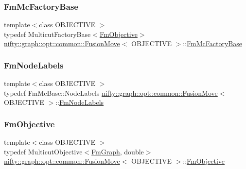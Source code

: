 \subsubsection{\texorpdfstring{Fm\+Mc\+Factory\+Base}{FmMcFactoryBase}}
{\footnotesize\ttfamily template$<$class O\+B\+J\+E\+C\+T\+I\+VE $>$ \\
typedef Multicut\+Factory\+Base$<$\hyperlink{classnifty_1_1graph_1_1opt_1_1common_1_1FusionMove_a238d47fabd4bf7f5a923885f9203536c}{Fm\+Objective}$>$ \hyperlink{classnifty_1_1graph_1_1opt_1_1common_1_1FusionMove}{nifty\+::graph\+::opt\+::common\+::\+Fusion\+Move}$<$ O\+B\+J\+E\+C\+T\+I\+VE $>$\+::\hyperlink{classnifty_1_1graph_1_1opt_1_1common_1_1FusionMove_af50b93c2e6e830750451b8cf05b4b657}{Fm\+Mc\+Factory\+Base}}

\mbox{\label{classnifty_1_1graph_1_1opt_1_1common_1_1FusionMove_a80565c2d37759eb6129a390468725c94}} 
\subsubsection{\texorpdfstring{Fm\+Node\+Labels}{FmNodeLabels}}
{\footnotesize\ttfamily template$<$class O\+B\+J\+E\+C\+T\+I\+VE $>$ \\
typedef Fm\+Mc\+Base\+::\+Node\+Labels \hyperlink{classnifty_1_1graph_1_1opt_1_1common_1_1FusionMove}{nifty\+::graph\+::opt\+::common\+::\+Fusion\+Move}$<$ O\+B\+J\+E\+C\+T\+I\+VE $>$\+::\hyperlink{classnifty_1_1graph_1_1opt_1_1common_1_1FusionMove_a80565c2d37759eb6129a390468725c94}{Fm\+Node\+Labels}}

\mbox{\label{classnifty_1_1graph_1_1opt_1_1common_1_1FusionMove_a238d47fabd4bf7f5a923885f9203536c}} 
\subsubsection{\texorpdfstring{Fm\+Objective}{FmObjective}}
{\footnotesize\ttfamily template$<$class O\+B\+J\+E\+C\+T\+I\+VE $>$ \\
typedef Multicut\+Objective$<$\hyperlink{classnifty_1_1graph_1_1opt_1_1common_1_1FusionMove_a0117bf1dc4f03da949dea05ba953c78e}{Fm\+Graph}, double$>$ \hyperlink{classnifty_1_1graph_1_1opt_1_1common_1_1FusionMove}{nifty\+::graph\+::opt\+::common\+::\+Fusion\+Move}$<$ O\+B\+J\+E\+C\+T\+I\+VE $>$\+::\hyperlink{classnifty_1_1graph_1_1opt_1_1common_1_1FusionMove_a238d47fabd4bf7f5a923885f9203536c}{Fm\+Objective}}

